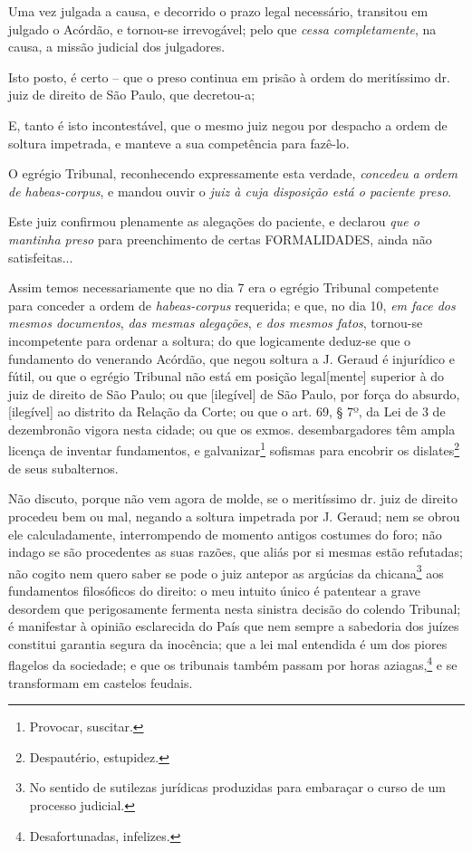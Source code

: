 Uma vez julgada a causa, e decorrido o prazo legal necessário, transitou
em julgado o Acórdão, e tornou-se irrevogável; pelo que \emph{cessa
completamente}, na causa, a missão judicial dos julgadores.

Isto posto, é certo -- que o preso continua em prisão à ordem do
meritíssimo dr. juiz de direito de São Paulo, que decretou-a;

E, tanto é isto incontestável, que o mesmo juiz negou por despacho a
ordem de soltura impetrada, e manteve a sua competência para fazê-lo.

O egrégio Tribunal, reconhecendo expressamente esta verdade,
\emph{concedeu a ordem de habeas-corpus}, e mandou ouvir o \emph{juiz à
cuja disposição está o paciente preso}.

Este juiz confirmou plenamente as alegações do paciente, e declarou
\emph{que o mantinha preso} para preenchimento de certas FORMALIDADES,
ainda não satisfeitas...

Assim temos necessariamente que no dia 7 era o egrégio Tribunal
competente para conceder a ordem de \emph{habeas-corpus} requerida; e
que, no dia 10, \emph{em face dos mesmos documentos}, \emph{das mesmas
alegações}, \emph{e dos mesmos fatos}, tornou-se incompetente para
ordenar a soltura; do que logicamente deduz-se que o fundamento do
venerando Acórdão, que negou soltura a J. Geraud é injurídico e fútil,
ou que o egrégio Tribunal não está em posição legal{[}mente{]} superior
à do juiz de direito de São Paulo; ou que {[}ilegível{]} de São Paulo, por
força do absurdo, {[}ilegível{]} ao distrito da Relação da Corte; ou que
o art. 69, § 7º, da Lei de 3 de dezembronão vigora nesta cidade; ou que
os exmos. desembargadores têm ampla licença de inventar fundamentos, e
galvanizar\footnote{ Provocar, suscitar.} sofismas para encobrir os
dislates\footnote{ Despautério, estupidez.} de seus subalternos.

Não discuto, porque não vem agora de molde, se o meritíssimo dr. juiz de
direito procedeu bem ou mal, negando a soltura impetrada por J. Geraud;
nem se obrou ele calculadamente, interrompendo de momento antigos
costumes do foro; não indago se são procedentes as suas razões, que
aliás por si mesmas estão refutadas; não cogito nem quero saber se pode
o juiz antepor as argúcias da chicana\footnote{ No sentido de sutilezas
  jurídicas produzidas para embaraçar o curso de um processo judicial.}
aos fundamentos filosóficos do direito: o meu intuito único é patentear
a grave desordem que perigosamente fermenta nesta sinistra decisão do
colendo Tribunal; é manifestar à opinião esclarecida do País que nem
sempre a sabedoria dos juízes constitui garantia segura da inocência;
que a lei mal entendida é um dos piores flagelos da sociedade; e que os
tribunais também passam por horas aziagas,\footnote{ Desafortunadas,
  infelizes.} e se transformam em castelos feudais.

